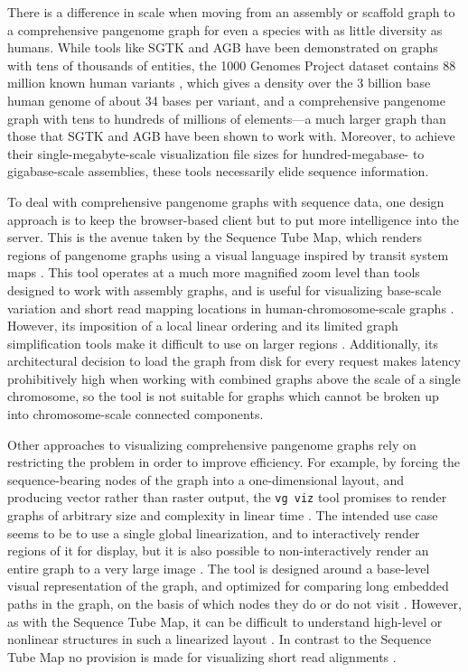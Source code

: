 There is a difference in scale when moving from an assembly or scaffold graph to a comprehensive pangenome graph for even a species with as little diversity as humans.
While tools like SGTK and AGB have been demonstrated on graphs with tens of thousands of entities, the 1000 Genomes Project dataset contains 88 million known human variants \citep{1000_2015}, which gives a density over the 3 billion base human genome of about 34 bases per variant, and a comprehensive pangenome graph with tens to hundreds of millions of elements---a much larger graph than those that SGTK and AGB have been shown to work with.
Moreover, to achieve their single-megabyte-scale visualization file sizes for hundred-megabase- to gigabase-scale assemblies, these tools necessarily elide sequence information.

To deal with comprehensive pangenome graphs with sequence data, one design approach is to keep the browser-based client but to put more intelligence into the server.
This is the avenue taken by the Sequence Tube Map, which renders regions of pangenome graphs using a visual language inspired by transit system maps \citep{Beyer_2019}.
This tool operates at a much more magnified zoom level than tools designed to work with assembly graphs, and is useful for visualizing base-scale variation and short read mapping locations in human-chromosome-scale graphs \citep{Beyer_2019}.
However, its imposition of a local linear ordering and its limited graph simplification tools make it difficult to use on larger regions \citep{Beyer_2019}.
Additionally, its architectural decision to load the graph from disk for every request makes latency prohibitively high when working with combined graphs above the scale of a single chromosome, so the tool is not suitable for graphs which cannot be broken up into chromosome-scale connected components.

Other approaches to visualizing comprehensive pangenome graphs rely on restricting the problem in order to improve efficiency.
For example, by forcing the sequence-bearing nodes of the graph into a one-dimensional layout, and producing vector rather than raster output, the \texttt{vg viz} tool promises to render graphs of arbitrary size and complexity in linear time \citep{Garrison_2019}. 
The intended use case seems to be to use a single global linearization, and to interactively render regions of it for display, but it is also possible to non-interactively render an entire graph to a very large image \citep{Garrison_2019}. 
The tool is designed around a base-level visual representation of the graph, and optimized for comparing long embedded paths in the graph, on the basis of which nodes they do or do not visit \citep{Garrison_2019}. 
However, as with the Sequence Tube Map, it can be difficult to understand high-level or nonlinear structures in such a linearized layout \citep{Garrison_2019}. 
In contrast to the Sequence Tube Map no provision is made for visualizing short read alignments \citep{Garrison_2019}. 


